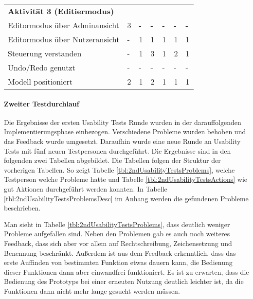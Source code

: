 \begin{table}[H]
\begin{tabular}{l|llllll}
        \textbf{Aktivität 3 (Editiermodus)} &           &           &           &           &           &           \\
        Editormodus über Adminansicht       &         3 &         - &         - &         - &         - &         - \\
        Editormodus über Nutzeransicht      &         - &         1 &         1 &         1 &         1 &         1 \\
        Steuerung verstanden                &         - &         1 &         3 &         1 &         2 &         1 \\
        Undo/Redo genutzt                   &         - &         - &         - &         - &         - &         - \\
        Modell positioniert                 &         2 &         1 &         2 &         1 &         1 &         1 \\
    \end{tabular}
\end{table}


\paragraph{Zweiter Testdurchlauf}

Die Ergebnisse der ersten Usability Tests Runde wurden in der darauffolgenden Implementierungsphase einbezogen. Verschiedene Probleme wurden behoben und das Feedback wurde umgesetzt. Daraufhin wurde eine neue Runde an Usability Tests mit fünf neuen Testpersonen durchgeführt. Die Ergebnisse sind in den folgenden zwei Tabellen abgebildet. Die Tabellen folgen der Struktur der vorherigen Tabellen. So zeigt Tabelle \ref{tbl:2ndUsabilityTestsProblems}, welche Testperson welche Probleme hatte und Tabelle \ref{tbl:2ndUsabilityTestsActions} wie gut Aktionen durchgeführt werden konnten. In Tabelle \ref{tbl:2ndUsabilityTestsProblemsDesc} im Anhang werden die gefundenen Probleme beschrieben. 

Man sieht in Tabelle \ref{tbl:2ndUsabilityTestsProblems}, dass deutlich weniger Probleme aufgefallen sind. Neben den Problemen gab es auch noch weiteres Feedback, dass sich aber vor allem auf Rechtschreibung, Zeichensetzung und Benennung beschränkt. Außerdem ist aus dem Feedback erkenntlich, dass das erste Auffinden von bestimmten Funktion etwas dauern kann, die Bedienung dieser Funktionen dann aber einwandfrei funktioniert. Es ist zu erwarten, dass die Bedienung des Prototyps bei einer erneuten Nutzung deutlich leichter ist, da die Funktionen dann nicht mehr lange gesucht werden müssen.

